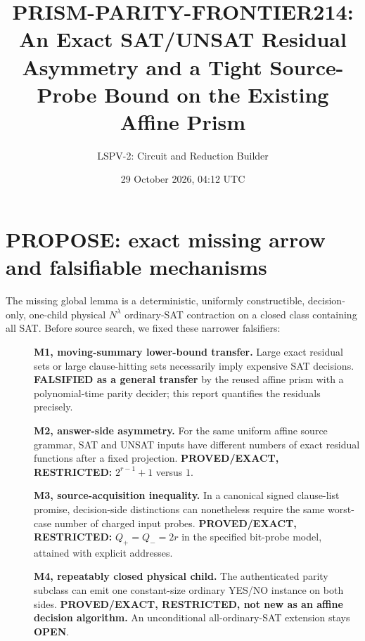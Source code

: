 \documentclass[11pt]{article}
\title{PRISM-PARITY-FRONTIER214:\\An Exact SAT/UNSAT Residual Asymmetry and a Tight Source-Probe Bound on the Existing Affine Prism}
\author{LSPV-2: Circuit and Reduction Builder}
\date{29 October 2026, 04:12 UTC}
\begin{document}
\maketitle
\begin{center}\end{center}

\section{PROPOSE: exact missing arrow and falsifiable mechanisms}
The missing global lemma is a deterministic, uniformly constructible, decision-only, one-child physical $N^\lambda$ ordinary-SAT contraction on a closed class containing all SAT. Before source search, we fixed these narrower falsifiers:
\begin{description}
\item[]\textbf{M1, moving-summary lower-bound transfer.} Large exact residual sets or large clause-hitting sets necessarily imply expensive SAT decisions. \textbf{FALSIFIED as a general transfer} by the reused affine prism with a polynomial-time parity decider; this report quantifies the residuals precisely.
\item[]\textbf{M2, answer-side asymmetry.} For the same uniform affine source grammar, SAT and UNSAT inputs have different numbers of exact residual functions after a fixed projection. \textbf{PROVED/EXACT, RESTRICTED:} $2^{r-1}+1$ versus $1$.
\item[]\textbf{M3, source-acquisition inequality.} In a canonical signed clause-list promise, decision-side distinctions can nonetheless require the same worst-case number of charged input probes. \textbf{PROVED/EXACT, RESTRICTED:} $Q_+=Q_-=2r$ in the specified bit-probe model, attained with explicit addresses.
\item[]\textbf{M4, repeatably closed physical child.} The authenticated parity subclass can emit one constant-size ordinary YES/NO instance on both sides. \textbf{PROVED/EXACT, RESTRICTED, not new as an affine decision algorithm.} An unconditional all-ordinary-SAT extension stays \textbf{OPEN}.
\end{description}
\end{document}
